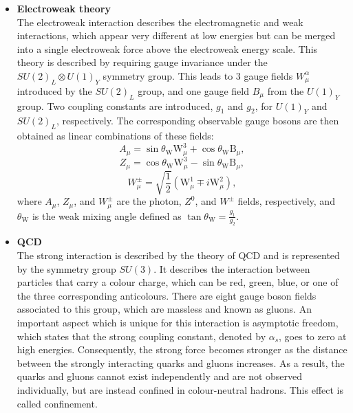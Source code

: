 \begin{itemize}
 \item[] \textbf{Electroweak theory}\\
 The electroweak interaction describes the electromagnetic and weak interactions, which appear very different at low energies but can be merged into a single electroweak force above the electroweak energy scale. This theory is described by requiring gauge invariance under the $SU(2)_L \otimes U(1)_Y$ symmetry group. This leads to 3 gauge fields $W_{\mu}^{\alpha}$ introduced by the $SU(2)_L$ group, and one gauge field $B_{\mu}$ from the $U(1)_Y$ group. Two coupling constants are introduced, $g_1$ and $g_2$, for $U(1)_Y$ and $SU(2)_L$, respectively. The corresponding observable gauge bosons are then obtained as linear combinations of these fields:
 \begin{equation}
  A_{\mu} = \sin\theta_{\mathrm{W}} \mathrm{W}^3_ {\mu} + \cos\theta_{\mathrm{W}}\mathrm{B}_{\mu},
 \end{equation}
 \begin{equation}
  Z_{\mu} = \cos\theta_{\mathrm{W}} \mathrm{W}^3_{\mu} - \sin\theta_{\mathrm{W}}\mathrm{B}_{\mu},
 \end{equation}
 \begin{equation}
  W_{\mu}^{\pm} = \sqrt{\frac{1}{2}}\left(\mathrm{W}^1_{\mu} \mp i\mathrm{W}^2_{\mu}\right),
 \end{equation}
 where $A_{\mu}$, $Z_{\mu}$, and $W_{\mu}^{\pm}$ are the photon, $Z^0$, and $W^{\pm}$ fields, respectively, and $\theta_{\mathrm{W}}$ is the weak mixing angle defined as $\tan\theta_{\mathrm{W}} = \frac{g_1}{g_2}$.

  \item[] \textbf{\ac{QCD}}\\
 The strong interaction is described by the theory of \acf{QCD} and is represented by the symmetry group $SU(3)$. It describes the interaction between particles that carry a colour charge, which can be red, green, blue, or one of the three corresponding anticolours. There are eight gauge boson fields associated to this group, which are massless and known as gluons. An important aspect which is unique for this interaction is asymptotic freedom, which states that the strong coupling constant, denoted by $\alpha_s$, goes to zero at high energies. Consequently, the strong force becomes stronger as the distance between the strongly interacting quarks and gluons increases. As a result, the quarks and gluons cannot exist independently and are not observed individually, but are instead confined in colour-neutral hadrons. This effect is called confinement.
\end{itemize}
  
